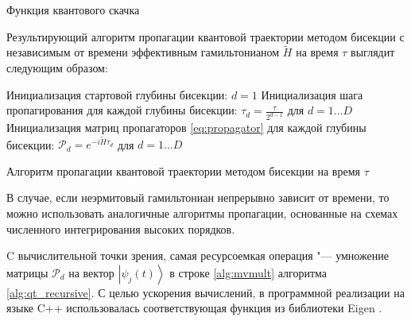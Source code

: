 \IncMargin{1em}
\begin{algorithm}
	\SetAlgoLined
	\caption{Функция квантового скачка}
	\label{alg:qt_jump}
\end{algorithm}
\DecMargin{1em}

Результирующий алгоритм пропагации квантовой траектории методом бисекции с независимым от времени эффективным гамильтонианом \(\tilde{H}\) на время \(\tau\) выглядит следующим образом:

\IncMargin{1em}
\begin{algorithm}
	\SetAlgoLined
	
	Инициализация стартовой глубины бисекции: \(d=1\)\;
	Инициализация шага пропагирования для каждой глубины бисекции: \(\tau_d = \frac{\tau}{2^{d-1}}\) для \(d=1 \ldots D\)\;
	Инициализация матриц пропагаторов \cref{eq:propagator} для каждой глубины бисекции: \(\mathcal{P}_{d} = e^{-i \tilde{H} \tau_d}\) для \(d=1 \ldots D\)\;
	\;

	\caption{Алгоритм пропагации квантовой траектории методом бисекции на время \(\tau\)}
	\label{alg:qt_prop}
\end{algorithm}
\DecMargin{1em}

В случае, если неэрмитовый гамильтониан непрерывно зависит от времени, то можно использовать аналогичные алгоритмы пропагации, основанные на схемах численного интегрирования высоких порядков.

C вычислительной точки зрения, самая ресурсоемкая операция "--- умножение матрицы \(\mathcal{P}_{d}\) на вектор \(\left| \psi_j(t) \right\rangle \) в строке \ref{alg:mvmult} алгоритма \ref{alg:qt_recursive}. С целью ускорения вычислений, в программной реализации на языке C++ использовалась соответствующая функция из библиотеки Eigen \cite{eigenweb}.

